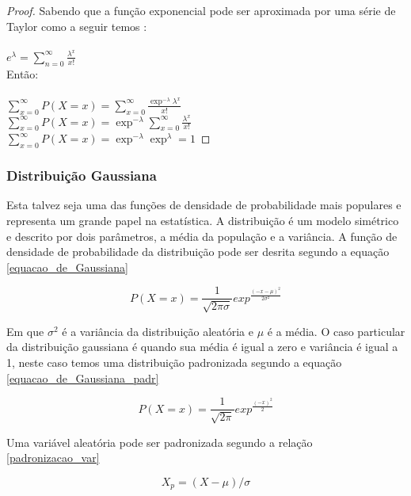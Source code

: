 \begin{proof}
Sabendo que a função exponencial pode ser aproximada por uma série de Taylor como a seguir temos :\\ \\
$e^{\lambda} = \sum_{n= 0}^{\infty} \frac{\lambda^{x}}{x!}$ \\
Então: \\ \\
$\sum_{x=0}^{\infty} P(X=x) = \sum_{x=0}^{\infty} \frac{\exp^{-\lambda}\lambda^{x}}{x!}$\\ 
$\sum_{x=0}^{\infty} P(X=x) = \exp^{-\lambda}\sum_{x=0}^{\infty} \frac{\lambda^{x}}{x!}$\\
$\sum_{x=0}^{\infty} P(X=x) = \exp^{-\lambda}\exp^{\lambda} = 1$
\end{proof}
 
\subsubsection{Distribuição Gaussiana }

Esta talvez seja uma das funções de densidade de probabilidade mais populares e representa um grande papel na estatística. A distribuição é um modelo simétrico e descrito por dois parâmetros, a média da população e a variância. A função de densidade de probabilidade da distribuição pode ser desrita segundo a equação \eqref{equacao_de_Gaussiana}

\begin{equation}\label{equacao_de_Gaussiana}
P(X = x) = \frac{1}{\sqrt{2\pi\sigma}}exp^{\frac{(-x-\mu)^2}{2\sigma^2}}
\end{equation}

Em que $\sigma^2$ é a variância da distribuição aleatória e $\mu$ é a média. O caso particular da distribuição gaussiana é quando sua média é igual a zero e variância é igual a 1, neste caso temos uma distribuição padronizada segundo a equação \eqref{equacao_de_Gaussiana_padr}

\begin{equation}\label{equacao_de_Gaussiana_padr}
P(X = x) = \frac{1}{\sqrt{2\pi}}exp^{\frac{(-x)^2}{2}}
\end{equation}

Uma variável aleatória pode ser padronizada segundo a relação \eqref{padronizacao_var}

\begin{equation}\label{padronizacao_var}
X_{p} = (X-\mu)/\sigma
\end{equation}

